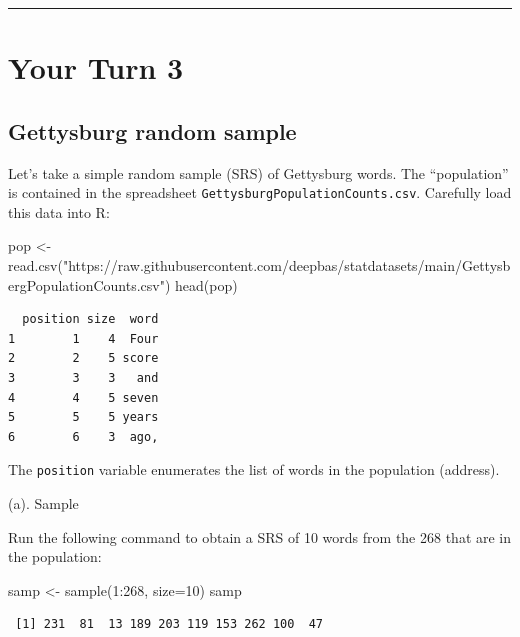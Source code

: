 \documentclass[
]{book}
\newenvironment{Shaded}{\begin{snugshade}}{\end{snugshade}}
\newcommand{\AttributeTok}[1]{\textcolor[rgb]{0.77,0.63,0.00}{#1}}
\newcommand{\DecValTok}[1]{\textcolor[rgb]{0.00,0.00,0.81}{#1}}
\newcommand{\FunctionTok}[1]{\textcolor[rgb]{0.00,0.00,0.00}{#1}}
\newcommand{\NormalTok}[1]{#1}
\newcommand{\OtherTok}[1]{\textcolor[rgb]{0.56,0.35,0.01}{#1}}
\newcommand{\SpecialCharTok}[1]{\textcolor[rgb]{0.00,0.00,0.00}{#1}}
\newcommand{\StringTok}[1]{\textcolor[rgb]{0.31,0.60,0.02}{#1}}
\begin{document}
\begin{center}\rule{0.5\linewidth}{0.5pt}\end{center}

\hypertarget{your-turn-3}{%
\section{Your Turn 3}\label{your-turn-3}}

\hypertarget{gettysburg-random-sample}{%
\subsection{Gettysburg random sample}\label{gettysburg-random-sample}}

Let's take a simple random sample (SRS) of Gettysburg words. The ``population'' is contained in the
spreadsheet \texttt{GettysburgPopulationCounts.csv}. Carefully load this data into R:

\begin{Shaded}
\begin{Highlighting}[]
\NormalTok{pop }\OtherTok{\textless{}{-}} \FunctionTok{read.csv}\NormalTok{(}\StringTok{"https://raw.githubusercontent.com/deepbas/statdatasets/main/GettysbergPopulationCounts.csv"}\NormalTok{)}
\FunctionTok{head}\NormalTok{(pop)}
\end{Highlighting}
\end{Shaded}

\begin{verbatim}
  position size  word
1        1    4  Four
2        2    5 score
3        3    3   and
4        4    5 seven
5        5    5 years
6        6    3  ago,
\end{verbatim}

The \texttt{position} variable enumerates the list of words in the population (address).

(a). Sample

Run the following command to obtain a SRS of 10 words from the 268 that are in the population:

\begin{Shaded}
\begin{Highlighting}[]
\NormalTok{samp }\OtherTok{\textless{}{-}} \FunctionTok{sample}\NormalTok{(}\DecValTok{1}\SpecialCharTok{:}\DecValTok{268}\NormalTok{, }\AttributeTok{size=}\DecValTok{10}\NormalTok{)}
\NormalTok{samp}
\end{Highlighting}
\end{Shaded}

\begin{verbatim}
 [1] 231  81  13 189 203 119 153 262 100  47
\end{verbatim}
\end{document}
